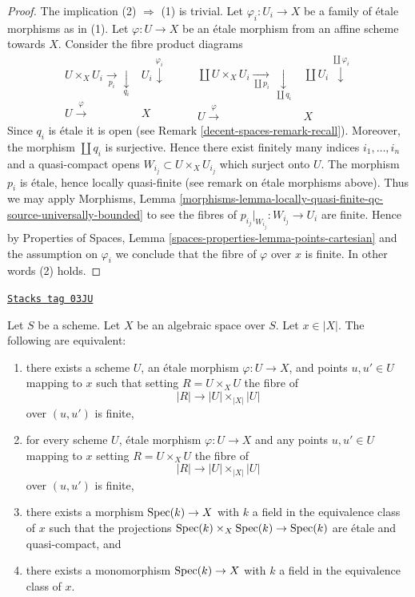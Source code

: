\begin{proof}
The implication (2) $\Rightarrow$ (1) is trivial.
Let $\varphi_i : U_i \to X$ be a family of \'etale morphisms as in (1).
Let $\varphi : U \to X$ be an \'etale morphism from an affine scheme
towards $X$. Consider the fibre product diagrams
$$
\begin{array}{cc}U \times_X U_i \underset{p_i}{\longrightarrow}\underset{q_i}{\downarrow} & U_i \overset{\varphi_i}{\downarrow} \\ U \overset{\varphi}{\longrightarrow} & X\end{array}
\quad \quad
\begin{array}{cc}\coprod U \times_X U_i \underset{\coprod p_i}{\longrightarrow}\underset{\coprod q_i}{\downarrow} & \coprod U_i \overset{\coprod \varphi_i}{\downarrow} \\ U \overset{\varphi}{\longrightarrow} & X\end{array}
$$
Since $q_i$ is \'etale it is open (see Remark \ref{decent-spaces-remark-recall}).
Moreover, the morphism $\coprod q_i$ is surjective.
Hence there exist finitely many indices $i_1, \ldots, i_n$ and
a quasi-compact opens $W_{i_j} \subset U \times_X U_{i_j}$
which surject onto $U$.
The morphism $p_i$ is \'etale, hence locally quasi-finite (see remark on
\'etale morphisms above). Thus we may apply
Morphisms, Lemma
\ref{morphisms-lemma-locally-quasi-finite-qc-source-universally-bounded}
to see the fibres of $p_{i_j}|_{W_{i_j}} : W_{i_j} \to U_i$ are finite.
Hence by
Properties of Spaces,
Lemma \ref{spaces-properties-lemma-points-cartesian}
and the assumption on $\varphi_i$ we conclude that the fibre
of $\varphi$ over $x$ is finite. In other words (2) holds.
\end{proof}

\begin{lemma}
\label{decent-spaces-lemma-R-finite-above-x}
\href{https://stacks.math.columbia.edu/tag/03JU}{\texttt{Stacks tag 03JU}}

Let $S$ be a scheme. Let $X$ be an algebraic space over $S$.
Let $x \in |X|$. The following are equivalent:
\begin{enumerate}
\item there exists a scheme $U$, an \'etale morphism
$\varphi : U \to X$, and points $u, u' \in U$ mapping to
$x$ such that setting $R = U \times_X U$ the fibre of
$$
|R| \to |U| \times_{|X|} |U|
$$
over $(u, u')$ is finite,
\item for every scheme $U$, \'etale morphism $\varphi : U \to X$ and
any points $u, u' \in U$ mapping to
$x$ setting $R = U \times_X U$ the fibre of
$$
|R| \to |U| \times_{|X|} |U|
$$
over $(u, u')$ is finite,
\item there exists a morphism $\operatorname{Spec}(k) \to X$ with $k$ a field
in the equivalence class of $x$ such that the projections
$\operatorname{Spec}(k) \times_X \operatorname{Spec}(k) \to \operatorname{Spec}(k)$ are
\'etale and quasi-compact, and
\item there exists a monomorphism $\operatorname{Spec}(k) \to X$ with $k$ a field
in the equivalence class of $x$.
\end{enumerate}
\end{lemma}

